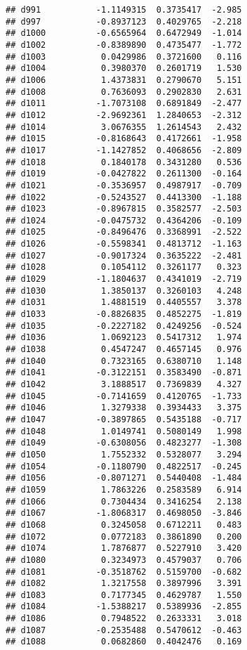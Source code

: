 \documentclass[
]{article}
\begin{document}
\begin{verbatim}
## d991           -1.1149315  0.3735417  -2.985
## d997           -0.8937123  0.4029765  -2.218
## d1000          -0.6565964  0.6472949  -1.014
## d1002          -0.8389890  0.4735477  -1.772
## d1003           0.0429986  0.3721600   0.116
## d1004           0.3980370  0.2601719   1.530
## d1006           1.4373831  0.2790670   5.151
## d1008           0.7636093  0.2902830   2.631
## d1011          -1.7073108  0.6891849  -2.477
## d1012          -2.9692361  1.2840653  -2.312
## d1014           3.0676355  1.2614543   2.432
## d1015          -0.8168643  0.4172661  -1.958
## d1017          -1.1427852  0.4068656  -2.809
## d1018           0.1840178  0.3431280   0.536
## d1019          -0.0427822  0.2611300  -0.164
## d1021          -0.3536957  0.4987917  -0.709
## d1022          -0.5243527  0.4413300  -1.188
## d1023          -0.8967815  0.3582577  -2.503
## d1024          -0.0475732  0.4364206  -0.109
## d1025          -0.8496476  0.3368991  -2.522
## d1026          -0.5598341  0.4813712  -1.163
## d1027          -0.9017324  0.3635222  -2.481
## d1028           0.1054112  0.3261177   0.323
## d1029          -1.1804637  0.4341019  -2.719
## d1030           1.3850137  0.3260103   4.248
## d1031           1.4881519  0.4405557   3.378
## d1033          -0.8826835  0.4852275  -1.819
## d1035          -0.2227182  0.4249256  -0.524
## d1036           1.0692123  0.5417312   1.974
## d1038           0.4547247  0.4657145   0.976
## d1040           0.7323165  0.6380710   1.148
## d1041          -0.3122151  0.3583490  -0.871
## d1042           3.1888517  0.7369839   4.327
## d1045          -0.7141659  0.4120765  -1.733
## d1046           1.3279338  0.3934433   3.375
## d1047          -0.3897865  0.5435188  -0.717
## d1048           1.0149741  0.5080149   1.998
## d1049          -0.6308056  0.4823277  -1.308
## d1050           1.7552332  0.5328077   3.294
## d1054          -0.1180790  0.4822517  -0.245
## d1056          -0.8071271  0.5440408  -1.484
## d1059           1.7863226  0.2583589   6.914
## d1066           0.7304434  0.3416254   2.138
## d1067          -1.8068317  0.4698050  -3.846
## d1068           0.3245058  0.6712211   0.483
## d1072           0.0772183  0.3861890   0.200
## d1074           1.7876877  0.5227910   3.420
## d1080           0.3234973  0.4579037   0.706
## d1081          -0.3518762  0.5159700  -0.682
## d1082           1.3217558  0.3897996   3.391
## d1083           0.7177345  0.4629787   1.550
## d1084          -1.5388217  0.5389936  -2.855
## d1086           0.7948522  0.2633331   3.018
## d1087          -0.2535488  0.5470612  -0.463
## d1088           0.0682860  0.4042476   0.169

\end{verbatim}
\end{document}
